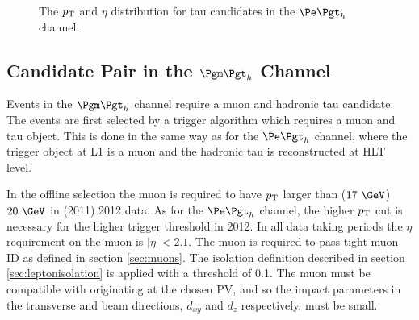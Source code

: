 \begin{figure}[htb]
\begin{center}

\end{center}
\caption{
The $p_{\mathrm{T}}$ and $\eta$ distribution for tau candidates in the $\etau$
channel.
}
\label{fig:etautaus}
\end{figure}

\subsection{Candidate Pair in the $\mutau$ Channel}

Events in the $\mutau$ channel require a muon and hadronic tau
candidate. The events are first selected by a trigger algorithm which requires
a muon and tau object. This is done in the same way as for the $\etau$ channel,
where the trigger object at \ac{L1} is a muon and the hadronic tau is
reconstructed at \ac{HLT} level.

In the offline selection the muon is required to have $p_{\mathrm{T}}$ larger than ($17~\GeV$)
$20~\GeV$ in (2011) 2012 data. As for the $\etau$ channel, the higher $p_{\mathrm{T}}$ cut is necessary for the
higher trigger threshold in 2012. In all data taking periods the $\eta$ requirement
on the muon is $|\eta| < 2.1$. The muon is required to pass tight muon ID as
defined in section \ref{sec:muons}. The isolation definition described in 
section \ref{sec:leptonisolation} is
applied with a threshold of 0.1. The muon must be compatible with
originating at the chosen \ac{PV}, and so the impact parameters in the
transverse and beam directions, $d_{xy}$ and $d_{z}$ respectively, must be
small. 

